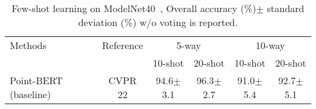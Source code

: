 \begin{table}[!t]
  \centering
  \scriptsize
    \setlength{\tabcolsep}{0.7mm}
  \caption{Few-shot learning on ModelNet40~\cite{wu20153d}, Overall accuracy (\%)$\pm$ standard deviation (\%)  w/o voting is reported.}
    \begin{tabular}{lccccc}
    \toprule
   \multirow{2.3}{*}{Methods}&\multirow{2.3}{*}{Reference} & \multicolumn{2}{c}{5-way} & \multicolumn{2}{c}{10-way} \\
\cmidrule{3-6}  &        & 10-shot & 20-shot & 10-shot & 20-shot \\
    \midrule
   Point-BERT~\cite{yu2022point} (baseline) & CVPR 22 &94.6$\pm$3.1 & 96.3$\pm$2.7 & 91.0$\pm$5.4 & 92.7$\pm$5.1 \\

\end{tabular}
\end{table}
